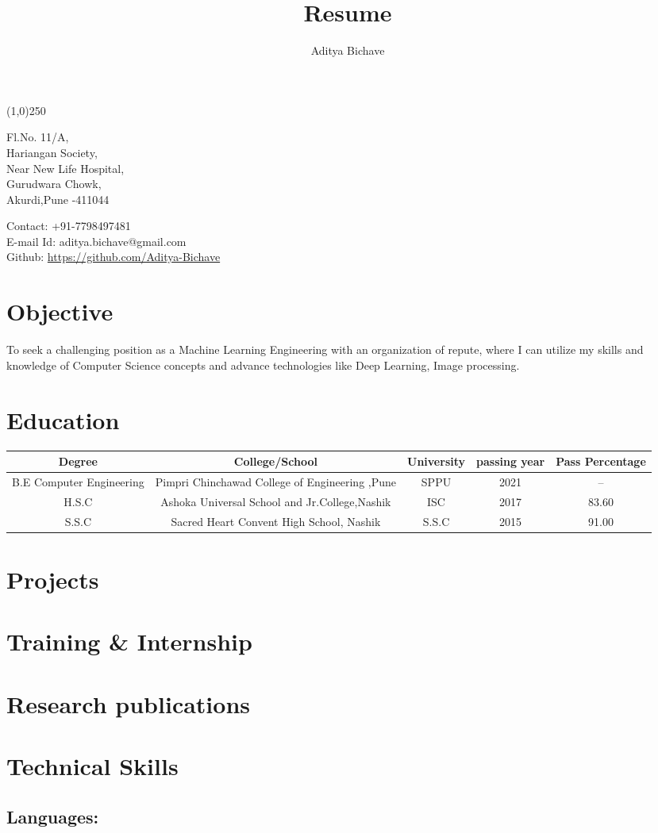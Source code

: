 \documentclass[10pt]{article}
\makeatletter
\renewcommand{\maketitle}{
\begin{center}
{\LARGE\bfseries
\theauthor}

\vspace{.25em}
\line(1,0){250}
\end{center}
\begin{multicols}{2}
\noindent
Fl.No. 11/A,\\
Hariangan Society,\\
Near New Life Hospital,\\
Gurudwara Chowk,\\
Akurdi,Pune -411044\\

\columnbreak
\begin{flushright}
Contact: +91-7798497481\\
E-mail Id: aditya.bichave@gmail.com\\
Github: \url{https://github.com/Aditya-Bichave}
\end{flushright}
\end{multicols}


}
\makeatother
\begin{document}
\title{Resume}
\author{Aditya Bichave}
\maketitle

\section{Objective}

To seek a challenging position as a Machine Learning Engineering with an organization of repute, where I can utilize my skills and knowledge of Computer Science concepts and advance technologies like Deep Learning, Image processing.

\section{Education}

\begin{tabular}[8pt]{| c | c | c | c | c |}
\hline
	Degree & College/School & University & passing year & Pass Percentage\\
\hline
	B.E Computer Engineering & Pimpri Chinchawad College of Engineering ,Pune & SPPU & 2021 & -- \\
\hline
	H.S.C & Ashoka Universal School and Jr.College,Nashik & ISC & 2017 & 83.60 \\
\hline
	S.S.C & Sacred Heart Convent High School, Nashik & S.S.C & 2015 & 91.00\\
\hline
\end{tabular} 

\section{Projects}



\section{Training \& Internship}

\section{Research publications}

\section{Technical Skills}
	\subsection{Languages:}
\end{document}
